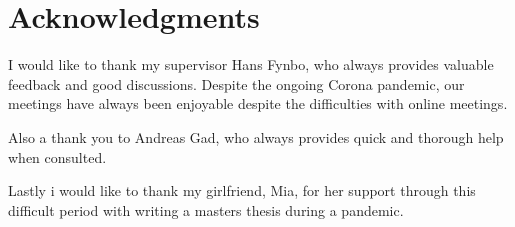 \chapter*{Acknowledgments}
I would like to thank my supervisor Hans Fynbo, who always provides valuable feedback and good discussions. Despite the ongoing Corona pandemic, our meetings have always been enjoyable despite the difficulties with online meetings. 

Also a thank you to Andreas Gad, who always provides quick and thorough help when consulted. 

Lastly i would like to thank my girlfriend, Mia, for her support through this difficult period with writing a masters thesis during a pandemic. 